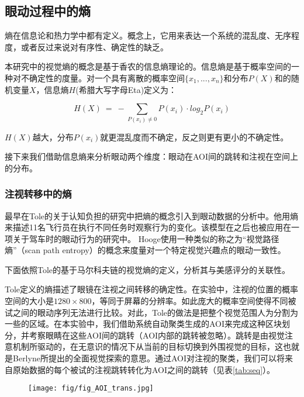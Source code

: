 \subsection{眼动过程中的熵}
熵在信息论和热力学中都有定义。概念上，它用来表达一个系统的混乱度、无序程度，或者反过来说对有序性、确定性的缺乏。

本研究中的视觉熵的概念是基于香农的信息熵理论的。信息熵是基于概率空间的一种对不确定性的度量。对一个具有离散的概率空间$\{x_1, ..., x_n\}$和分布$P(X)$和的随机变量$X$，信息熵$H$(希腊大写字母Eta)定义为：

$$H(X)~=~-\sum_{P(x_i)\neq 0} P(x_i)\cdot log_{2}P(x_i)$$

$H(X)$越大，分布$P(x_i)$就更混乱度而不确定，反之则更有更小的不确定性。

接下来我们借助信息熵来分析眼动两个维度：眼动在AOI间的跳转和注视在空间上的分布。

\subsubsection{注视转移中的熵}
最早在Tole的关于认知负担的研究中把熵的概念引入到眼动数据的分析中。他用熵来描述11名飞行员在执行不同任务时观察行为的变化。该模型在之后也被应用在一项关于驾车时的眼动行为的研究中。
Hooge使用一种类似的称之为“视觉路径熵”（scan path entropy）的概念来度量对一个特定视觉兴趣点的眼动一致性。

下面依照Tole的基于马尔科夫链的视觉熵的定义，分析其与美感评分的关联性。

Tole定义的熵描述了眼镜在注视之间转移的确定性。在实验中，注视的位置的概率空间的大小是$1280\times800$，等同于屏幕的分辨率。如此庞大的概率空间使得不同被试之间的眼动序列无法进行比较。对此，Tole的做法是把整个视觉范围人为分割为一些的区域。在本实验中，我们借助系统自动聚类生成的AOI来完成这种区块划分，并考察眼睛在这些AOI间的跳转（AOI内部的跳转被忽略）。跳转是由视觉注意机制所驱动的，在无意识的情况下从当前的目标切换到外围视觉的目标，这也就是Berlyne所提出的全面视觉探索的意思。通过AOI对注视的聚类，我们可以将来自原始数据的每个被试的注视跳转转化为AOI之间的跳转（见表\ref{tab:seq}）。

\begin{figure}[H]
  \centering
  \texttt{[image: fig/fig\_AOI\_trans.jpg]}
\end{figure}

